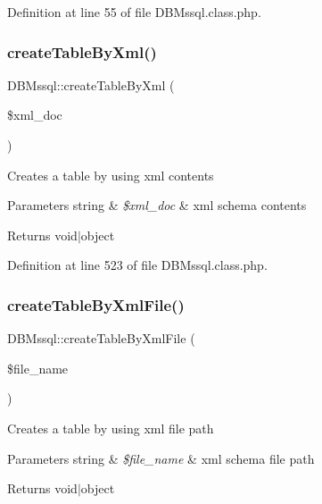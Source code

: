 Definition at line 55 of file D\+B\+Mssql.\+class.\+php.

\mbox{\label{classDBMssql_a7a3ff51c1a29e47c02f358dc6064d88b}} 
\subsubsection{\texorpdfstring{create\+Table\+By\+Xml()}{createTableByXml()}}
{\footnotesize\ttfamily D\+B\+Mssql\+::create\+Table\+By\+Xml (\begin{DoxyParamCaption}\item[{}]{\$xml\+\_\+doc }\end{DoxyParamCaption})}

Creates a table by using xml contents 
\begin{DoxyParams}[1]{Parameters}
string & {\em \$xml\+\_\+doc} & xml schema contents \\
\hline
\end{DoxyParams}
\begin{DoxyReturn}{Returns}
void$\vert$object 
\end{DoxyReturn}


Definition at line 523 of file D\+B\+Mssql.\+class.\+php.

\mbox{\label{classDBMssql_ae136845dee2ecc1bd8fe3a7c535572f4}} 
\subsubsection{\texorpdfstring{create\+Table\+By\+Xml\+File()}{createTableByXmlFile()}}
{\footnotesize\ttfamily D\+B\+Mssql\+::create\+Table\+By\+Xml\+File (\begin{DoxyParamCaption}\item[{}]{\$file\+\_\+name }\end{DoxyParamCaption})}

Creates a table by using xml file path 
\begin{DoxyParams}[1]{Parameters}
string & {\em \$file\+\_\+name} & xml schema file path \\
\hline
\end{DoxyParams}
\begin{DoxyReturn}{Returns}
void$\vert$object 
\end{DoxyReturn}


